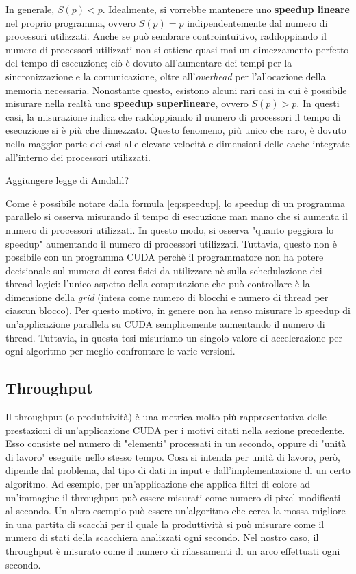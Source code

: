 \documentclass[a4paper]{article}
\begin{document}
	In generale, $S(p) < p$. Idealmente, si vorrebbe mantenere uno \textbf{speedup lineare} nel proprio programma, ovvero $S(p) = p$ indipendentemente dal numero di processori utilizzati. Anche se può sembrare controintuitivo, raddoppiando il numero di processori utilizzati non si ottiene quasi mai un dimezzamento perfetto del tempo di esecuzione; ciò è dovuto all'aumentare dei tempi per la sincronizzazione e la comunicazione, oltre all'\textit{overhead} per l'allocazione della memoria necessaria. Nonostante questo, esistono alcuni rari casi in cui è possibile misurare nella realtà uno \textbf{speedup superlineare}, ovvero $S(p) > p$. In questi casi, la misurazione indica che raddoppiando il numero di processori il tempo di esecuzione si è più che dimezzato. Questo fenomeno, più unico che raro, è dovuto nella maggior parte dei casi alle elevate velocità e dimensioni delle cache integrate all'interno dei processori utilizzati.
	
	Aggiungere legge di Amdahl?
	
	Come è possibile notare dalla formula \ref{eq:speedup}, lo speedup di un programma parallelo si osserva misurando il tempo di esecuzione man mano che si aumenta il numero di processori utilizzati. In questo modo, si osserva "quanto peggiora lo speedup" aumentando il numero di processori utilizzati. Tuttavia, questo non è possibile con un programma CUDA perchè il programmatore non ha potere decisionale sul numero di cores fisici da utilizzare nè sulla schedulazione dei thread logici: l'unico aspetto della computazione che può controllare è la dimensione della \textit{grid} (intesa come numero di blocchi e numero di thread per ciascun blocco). Per questo motivo, in genere non ha senso misurare lo speedup di un'applicazione parallela su CUDA semplicemente aumentando il numero di thread. Tuttavia, in questa tesi misuriamo un singolo valore di accelerazione per ogni algoritmo per meglio confrontare le varie versioni.
	
	\subsection{Throughput}
	Il throughput (o produttività) è una metrica molto più rappresentativa delle prestazioni di un'applicazione CUDA per i motivi citati nella sezione precedente. Esso consiste nel numero di "elementi" processati in un secondo, oppure di "unità di lavoro" eseguite nello stesso tempo. Cosa si intenda per unità di lavoro, però, dipende dal problema, dal tipo di dati in input e dall'implementazione di un certo algoritmo. Ad esempio, per un'applicazione che applica filtri di colore ad un'immagine il throughput può essere misurati come numero di pixel modificati al secondo. Un altro esempio può essere un'algoritmo che cerca la mossa migliore in una partita di scacchi per il quale la produttività si può misurare come il numero di stati della scacchiera analizzati ogni secondo. Nel nostro caso, il throughput è misurato come il numero di rilassamenti di un arco effettuati ogni secondo.
	
\end{document}
